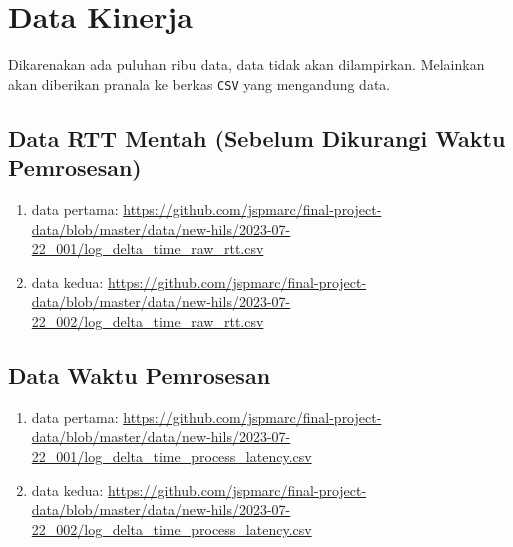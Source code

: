 \chapter{Data Kinerja}\label{appendix-performance-data}
\setcounter{section}{0}

Dikarenakan ada puluhan ribu data, data tidak akan dilampirkan. Melainkan
akan diberikan pranala ke berkas \texttt{CSV} yang mengandung data.

\section{Data RTT Mentah (Sebelum Dikurangi Waktu Pemrosesan)}

\begin{enumerate}
	\item data pertama:
	      \url{https://github.com/jspmarc/final-project-data/blob/master/data/new-hils/2023-07-22_001/log_delta_time_raw_rtt.csv}
	\item data kedua:
	      \url{https://github.com/jspmarc/final-project-data/blob/master/data/new-hils/2023-07-22_002/log_delta_time_raw_rtt.csv}
\end{enumerate}

\section{Data Waktu Pemrosesan}

\begin{enumerate}
	\item data pertama:
	      \url{https://github.com/jspmarc/final-project-data/blob/master/data/new-hils/2023-07-22_001/log_delta_time_process_latency.csv}
	\item data kedua:
	      \url{https://github.com/jspmarc/final-project-data/blob/master/data/new-hils/2023-07-22_002/log_delta_time_process_latency.csv}
\end{enumerate}
